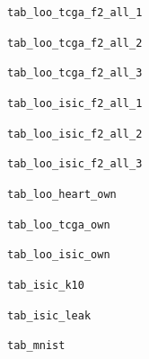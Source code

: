 \documentclass[10pt]{article}
\begin{document}
\begin{table}[p]\centering\small
\caption{\texttt{tab\_loo\_tcga\_f2\_all\_1}}
\resizebox{\linewidth}{!}{}
\end{table}
\begin{table}[p]\centering\small
\caption{\texttt{tab\_loo\_tcga\_f2\_all\_2}}
\resizebox{\linewidth}{!}{}
\end{table}
\begin{table}[p]\centering\small
\caption{\texttt{tab\_loo\_tcga\_f2\_all\_3}}
\resizebox{\linewidth}{!}{}
\end{table}
\begin{table}[p]\centering\small
\caption{\texttt{tab\_loo\_isic\_f2\_all\_1}}
\resizebox{\linewidth}{!}{}
\end{table}
\begin{table}[p]\centering\small
\caption{\texttt{tab\_loo\_isic\_f2\_all\_2}}
\resizebox{\linewidth}{!}{}
\end{table}
\begin{table}[p]\centering\small
\caption{\texttt{tab\_loo\_isic\_f2\_all\_3}}
\resizebox{\linewidth}{!}{}
\end{table}
\begin{table}[p]\centering\small
\caption{\texttt{tab\_loo\_heart\_own}}
\resizebox{\linewidth}{!}{}
\end{table}
\begin{table}[p]\centering\small
\caption{\texttt{tab\_loo\_tcga\_own}}
\resizebox{\linewidth}{!}{}
\end{table}
\begin{table}[p]\centering\small
\caption{\texttt{tab\_loo\_isic\_own}}
\resizebox{\linewidth}{!}{}
\end{table}
\begin{table}[p]\centering\small
\caption{\texttt{tab\_isic\_k10}}
\resizebox{\linewidth}{!}{}
\end{table}
\begin{table}[p]\centering\small
\caption{\texttt{tab\_isic\_leak}}
\resizebox{\linewidth}{!}{}
\end{table}
\begin{table}[p]\centering\small
\caption{\texttt{tab\_mnist}}
\resizebox{\linewidth}{!}{}
\end{table}
\clearpage

\end{document}

